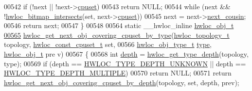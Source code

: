 \begin{DoxyCode}
{{00542   \textcolor{keywordflow}{if} (!next || !next->\hyperlink{a00016_a67925e0f2c47f50408fbdb9bddd0790f}{cpuset})
00543     \textcolor{keywordflow}{return} NULL;
00544   \textcolor{keywordflow}{while} (next && !\hyperlink{a00065_ga575c27953709a8cb9a047aae65157526}{hwloc_bitmap_intersects}(\textcolor{keyword}{set}, next->\hyperlink{a00016_a67925e0f2c47f50408fbdb9bddd0790f}{cpuset}))
00545     next = next->\hyperlink{a00016_a85a788017457129589318b6c39451acf}{next_cousin};
00546   \textcolor{keywordflow}{return} next;
00547 \}
00548 
00564 \textcolor{keyword}{static} \_\_hwloc\_inline \hyperlink{a00016}{hwloc_obj_t}
\hypertarget{a00031_source_l00565}{}\hyperlink{a00056_ga5915ea30f326676b3a4cfff371ce04d1}{00565} \hyperlink{a00056_ga5915ea30f326676b3a4cfff371ce04d1}{hwloc_get_next_obj_covering_cpuset_by_type}(\hyperlink{a00039_ga9d1e76ee15a7dee158b786c30b6a6e38}{hwloc_topology_t} topology, 
      \hyperlink{a00040_ga1f784433e9b606261f62d1134f6a3b25}{hwloc_const_cpuset_t} \textcolor{keyword}{set},
00566                                            \hyperlink{a00041_gacd37bb612667dc437d66bfb175a8dc55}{hwloc_obj_type_t} \hyperlink{a00016_acc4f0803f244867e68fe0036800be5de}{type}, \hyperlink{a00016}{hwloc_obj_t} pre
      v)
00567 \{
00568   \textcolor{keywordtype}{int} \hyperlink{a00016_a9d82690370275d42d652eccdea5d3ee5}{depth} = \hyperlink{a00046_gaea7c64dd59467f5201ba87712710b14d}{hwloc_get_type_depth}(topology, type);
00569   \textcolor{keywordflow}{if} (depth == \hyperlink{a00046_ggaf4e663cf42bbe20756b849c6293ef575a0565ab92ab72cb0cec91e23003294aad}{HWLOC_TYPE_DEPTH_UNKNOWN} || depth == \hyperlink{a00046_ggaf4e663cf42bbe20756b849c6293ef575ae99465995cacde6c210d5fc2e409798c}{HWLOC_TYPE_DEPTH_MULTIPLE})
00570     \textcolor{keywordflow}{return} NULL;
00571   \textcolor{keywordflow}{return} \hyperlink{a00056_ga2f9a4ec15e9cfae8c21501257a51ce5b}{hwloc_get_next_obj_covering_cpuset_by_depth}(topology, \textcolor{keyword}{set}, depth, prev);
      
}}
\end{DoxyCode}
